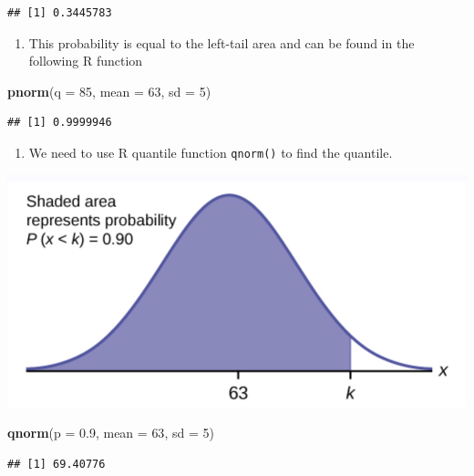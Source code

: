 \documentclass[
]{book}
\newenvironment{Shaded}{\begin{snugshade}}{\end{snugshade}}
\newcommand{\AttributeTok}[1]{\textcolor[rgb]{0.13,0.29,0.53}{#1}}
\newcommand{\DecValTok}[1]{\textcolor[rgb]{0.00,0.00,0.81}{#1}}
\newcommand{\FloatTok}[1]{\textcolor[rgb]{0.00,0.00,0.81}{#1}}
\newcommand{\FunctionTok}[1]{\textcolor[rgb]{0.13,0.29,0.53}{\textbf{#1}}}
\newcommand{\NormalTok}[1]{#1}
\providecommand{\tightlist}{%
  \setlength{\itemsep}{0pt}\setlength{\parskip}{0pt}}
\begin{document}
\begin{verbatim}
## [1] 0.3445783
\end{verbatim}

\begin{enumerate}
\def\labelenumi{\arabic{enumi}.}
\setcounter{enumi}{1}
\tightlist
\item
  This probability is equal to the left-tail area and can be found in the following R function
\end{enumerate}

\begin{Shaded}
\begin{Highlighting}[]
\FunctionTok{pnorm}\NormalTok{(}\AttributeTok{q =} \DecValTok{85}\NormalTok{, }\AttributeTok{mean =} \DecValTok{63}\NormalTok{, }\AttributeTok{sd =} \DecValTok{5}\NormalTok{)}
\end{Highlighting}
\end{Shaded}

\begin{verbatim}
## [1] 0.9999946
\end{verbatim}

\begin{enumerate}
\def\labelenumi{\arabic{enumi}.}
\setcounter{enumi}{2}
\tightlist
\item
  We need to use R quantile function \texttt{qnorm()} to find the quantile.
\end{enumerate}

\begin{center}\includegraphics[width=0.4\linewidth]{topic03/exmple5-2} \end{center}

\begin{Shaded}
\begin{Highlighting}[]
\FunctionTok{qnorm}\NormalTok{(}\AttributeTok{p =} \FloatTok{0.9}\NormalTok{, }\AttributeTok{mean =} \DecValTok{63}\NormalTok{, }\AttributeTok{sd =} \DecValTok{5}\NormalTok{)}
\end{Highlighting}
\end{Shaded}

\begin{verbatim}
## [1] 69.40776
\end{verbatim}
\end{document}

